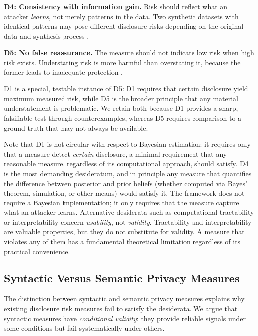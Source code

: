 \documentclass[Afour,sageh,times,doublespace]{sagej}
\begin{document}
\textbf{D4: Consistency with information gain.} Risk should reflect what an attacker \textit{learns}, not merely patterns in the data. Two synthetic datasets with identical patterns may pose different disclosure risks depending on the original data and synthesis process \citep{DuncanLambert1986, reiter2014}.

\textbf{D5: No false reassurance.} The measure should not indicate low risk when high risk exists. Understating risk is more harmful than overstating it, because the former leads to inadequate protection \citep{Elliot2014, Wagner2018}.

D1 is a special, testable instance of D5: D1 requires that certain disclosure yield maximum measured risk, while D5 is the broader principle that any material understatement is problematic. We retain both because D1 provides a sharp, falsifiable test through counterexamples, whereas D5 requires comparison to a ground truth that may not always be available.

Note that D1 is not circular with respect to Bayesian estimation: it requires only that a measure detect \textit{certain} disclosure, a minimal requirement that any reasonable measure, regardless of its computational approach, should satisfy. D4 is the most demanding desideratum, and in principle any measure that quantifies the difference between posterior and prior beliefs (whether computed via Bayes' theorem, simulation, or other means) would satisfy it. The framework does not require a Bayesian implementation; it only requires that the measure capture what an attacker learns. Alternative desiderata such as computational tractability or interpretability concern \textit{usability}, not \textit{validity}. Tractability and interpretability are valuable properties, but they do not substitute for validity. A measure that violates any of them has a fundamental theoretical limitation regardless of its practical convenience.

\subsection{Syntactic Versus Semantic Privacy Measures}

The distinction between syntactic and semantic privacy measures explains why existing disclosure risk measures fail to satisfy the desiderata. We argue that syntactic measures have \textit{conditional validity}: they provide reliable signals under some conditions but fail systematically under others.
\end{document}
